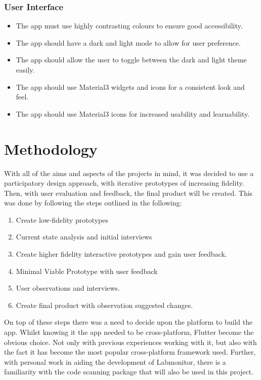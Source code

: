 \documentclass [11pt,a4paper]{article}
\begin{document}
\subsubsection{User Interface}
\begin{itemize}
    \item The app must use highly contrasting colours to ensure good accessibility.
    \item The app should have a dark and light mode to allow for user preference.
    \item The app should allow the user to toggle between the dark and light theme easily. 
    \item The app should use Material3 widgets and icons for a consistent look and feel.
    \item The app should use Material3 icons for increased usability and learnability.
\end{itemize}

\section{Methodology}
\label{sec:methodology}



With all of the aims and aspects of the projects in mind, it was decided to use a participatory design approach, with iterative prototypes of increasing fidelity. Then, with user evaluation and feedback, the final product will be created. This was done by following the steps outlined in the following:

\begin{enumerate}
    \item Create low-fidelity prototypes
    \item Current state analysis and initial interviews
    \item Create higher fidelity interactive prototypes and gain user feedback.
    \item Minimal Viable Prototype with user feedback
    \item User observations and interviews.
    \item Create final product with observation suggested changes.
\end{enumerate}

On top of these steps there was a need to decide upon the platform to build the app. Whilst knowing it the app needed to be cross-platform, Flutter become the obvious choice. Not only with previous experiences working with it, but also with the fact it has become the most popular cross-platform framework \cite{JetBrainsFlutter} used. Further, with personal work in aiding the development of Labmonitor\cite{labmonitor}, there is a familiarity with the code scanning package that will also be used in this project\cite{barcodeScannerPlugin}.
\end{document}
